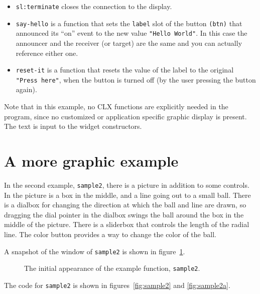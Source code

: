 \documentclass[twoside,openright,11pt]{report}
\newcommand{\tp}[1]{\texttt{#1}}
\begin{document}
\begin{itemize}
\item \tp{sl:terminate} closes the connection to the display.

\item \tp{say-hello} is a function that sets the \tp{label} slot of
the button \tp{(btn)} that announced its ``on'' event to the new value
\tp{"Hello World"}.  In this case the announcer and the receiver (or
target) are the same and you can actually reference either one.

\item \tp{reset-it} is a function that resets the value of the label
to the original \tp{"Press here"}, when the button is turned off (by
the user pressing the button again).

\end{itemize}

Note that in this example, no CLX functions are explicitly needed in
the program, since no customized or application specific graphic
display is present.  The text is input to the widget constructors.

\section{A more graphic example}

In the second example, \tp{sample2}, there is a picture in addition to
some controls.  In the picture is a box in the middle, and a line
going out to a small ball.  There is a dialbox for changing the
direction at which the ball and line are drawn, so dragging the dial
pointer in the dialbox swings the ball around the box in the middle of
the picture.  There is a sliderbox that controls the length of the
radial line.  The color button provides a way to change the color of
the ball.

A snapshot of the window of \tp{sample2} is shown in
figure~\ref{fig:sample2-screen}.

\begin{figure}[htb]
\begin{center}
\vspace*{4mm}
\leavevmode
{}
\end{center}
\caption{The initial appearance of the example function,
\tp{sample2}.} \label{fig:sample2-screen}
\end{figure}

The code for \tp{sample2} is shown in figures~\ref{fig:sample2} and
\ref{fig:sample2a}.
\end{document}

